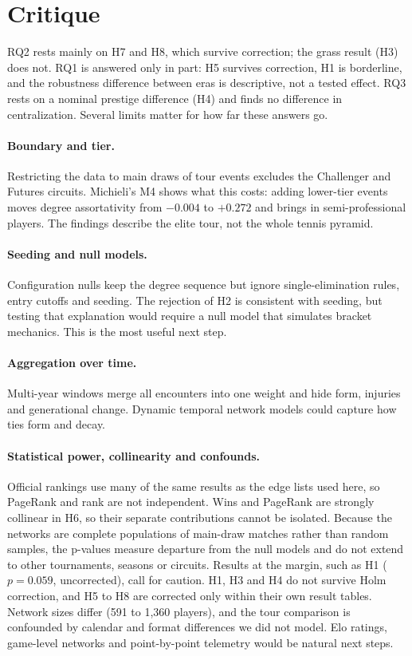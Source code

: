 \documentclass[12pt, a4paper]{article}
\begin{document}
\section{Critique}
\label{critique}

RQ2 rests mainly on H7 and H8, which survive correction; the grass result (H3) does not. RQ1 is answered only in part: H5 survives correction, H1 is borderline, and the robustness difference between eras is descriptive, not a tested effect. RQ3 rests on a nominal prestige difference (H4) and finds no difference in centralization. Several limits matter for how far these answers go.

\paragraph{Boundary and tier.} Restricting the data to main draws of tour events excludes the Challenger and Futures circuits. Michieli's M4 shows what this costs: adding lower-tier events moves degree assortativity from $-0.004$ to $+0.272$ and brings in semi-professional players. The findings describe the elite tour, not the whole tennis pyramid.

\paragraph{Seeding and null models.} Configuration nulls keep the degree sequence but ignore single-elimination rules, entry cutoffs and seeding. The rejection of H2 is consistent with seeding, but testing that explanation would require a null model that simulates bracket mechanics. This is the most useful next step.

\paragraph{Aggregation over time.} Multi-year windows merge all encounters into one weight and hide form, injuries and generational change. Dynamic temporal network models could capture how ties form and decay.

\paragraph{Statistical power, collinearity and confounds.} Official rankings use many of the same results as the edge lists used here, so PageRank and rank are not independent. Wins and PageRank are strongly collinear in H6, so their separate contributions cannot be isolated. Because the networks are complete populations of main-draw matches rather than random samples, the p-values measure departure from the null models and do not extend to other tournaments, seasons or circuits. Results at the margin, such as H1 ($p = 0.059$, uncorrected), call for caution. H1, H3 and H4 do not survive Holm correction, and H5 to H8 are corrected only within their own result tables. Network sizes differ (591 to 1,360 players), and the tour comparison is confounded by calendar and format differences we did not model. Elo ratings, game-level networks and point-by-point telemetry would be natural next steps.
\end{document}

